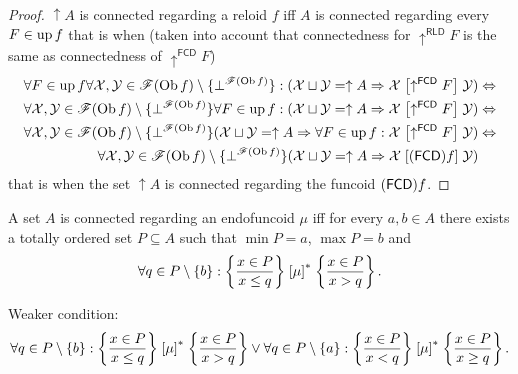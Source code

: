 \begin{proof}
$\uparrow A$ is connected regarding a reloid $f$ iff $A$
is connected regarding every $F\in\operatorname{up} f$ that is when (taken into
account that connectedness for $\uparrow^{\mathsf{RLD}}F$ is the
same as connectedness of $\uparrow^{\mathsf{FCD}}F$)
\begin{align*}
\forall F\in\operatorname{up} f\forall\mathcal{X},\mathcal{Y}\in\mathscr{F}(\operatorname{Ob} f)\setminus\{\bot^{\mathscr{F}(\operatorname{Ob} f)}\}:(\mathcal{X}\sqcup\mathcal{Y}=\uparrow A\Rightarrow\mathcal{X}\mathrel{\left[\uparrow^{\mathsf{FCD}}F\right]}\mathcal{Y}) & \Leftrightarrow\\
\forall\mathcal{X},\mathcal{Y}\in\mathscr{F}(\operatorname{Ob} f)\setminus\{\bot^{\mathscr{F}(\operatorname{Ob} f)}\}\forall F\in\operatorname{up} f:(\mathcal{X}\sqcup\mathcal{Y}=\uparrow A\Rightarrow\mathcal{X}\mathrel{\left[\uparrow^{\mathsf{FCD}}F\right]}\mathcal{Y}) & \Leftrightarrow\\
\forall\mathcal{X},\mathcal{Y}\in\mathscr{F}(\operatorname{Ob} f)\setminus\{\bot^{\mathscr{F}(\operatorname{Ob} f)}\}(\mathcal{X}\sqcup\mathcal{Y}=\uparrow A\Rightarrow\forall F\in\operatorname{up} f:\mathcal{X}\mathrel{\left[\uparrow^{\mathsf{FCD}}F\right]}\mathcal{Y}) & \Leftrightarrow\\
\forall\mathcal{X},\mathcal{Y}\in\mathscr{F}(\operatorname{Ob} f)\setminus\{\bot^{\mathscr{F}(\operatorname{Ob} f)}\}(\mathcal{X}\sqcup\mathcal{Y}=\uparrow A\Rightarrow\mathcal{X}\mathrel{\left[(\mathsf{FCD}) f\right]}\mathcal{Y})
\end{align*}
that is when the set $\uparrow A$ is connected regarding
the funcoid $(\mathsf{FCD}) f$.\end{proof}
\begin{conjecture}
A set $A$ is connected regarding an endofuncoid $\mu$ iff for every
$a,b\in A$ there exists a totally ordered set $P\subseteq A$ such
that $\min P=a$, $\max P=b$ and
\[
\forall q\in P\setminus\{b\}:\left\{ \frac{x\in P}{x\le q}\right\}\mathrel{\left[\mu\right]^{\ast}}\left\{ \frac{x\in P}{x>q}\right\}.
\]


Weaker condition:
\[
\forall q\in P\setminus\{b\}:\left\{ \frac{x\in P}{x\le q}\right\}\mathrel{\left[\mu\right]^{\ast}}\left\{ \frac{x\in P}{x>q}\right\}\lor\forall q\in P\setminus\{a\}:\left\{ \frac{x\in P}{x<q}\right\}\mathrel{\left[\mu\right]^{\ast}}\left\{ \frac{x\in P}{x\ge q}\right\}.
\]

\end{conjecture}

